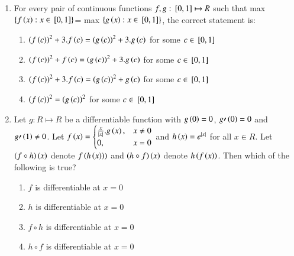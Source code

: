 \documentclass[journal,12pt,twocolumn]{IEEEtran}
\theoremstyle{remark}
\begin{document}
\begin{enumerate}
    \item 
    For every pair of continuous functions $f, g: {}\left[0, 1\right]\mapsto R$ such that max $\left\{f\left(x\right): x\in {}\left[0, 1\right]\right\}$= max $\left\{g\left(x\right): x\in {}\left[0, 1\right]\right\}$, the correct statement is:
   
    \hfill 
    {}
    
    \begin{enumerate}[label=(\alph*)]
        
        \item ${\left(f\left(c\right)\right)}^2+3.f\left(c\right)={\left(g\left(c\right)\right)}^2+3.g\left(c\right)$ for some $c\in {}\left[0,1\right]$
        \item ${\left(f\left(c\right)\right)}^2+f\left(c\right)={\left(g\left(c\right)\right)}^2+3.g\left(c\right)$ for some $c\in {}\left[0,1\right]$
        \item ${\left(f\left(c\right)\right)}^2+3.f\left(c\right)={\left(g\left(c\right)\right)}^2+g\left(c\right)$ for some $c\in {}\left[0,1\right]$
        \item ${\left(f\left(c\right)\right)}^2={\left(g\left(c\right)\right)}^2$ for some $c\in {}\left[0,1\right]$ 
    \end{enumerate}


    \item 
    Let $g: R\mapsto R$ be a differentiable function with $g\left(0\right)=0$, $g\prime\left(0\right)=0$ and $g\prime\left(1\right)\neq 0$. Let $f\left(x\right)=
        \begin{cases}
		\frac{x}{\left\vert x\right\vert}.g\left(x\right), & x\neq 0 \\
            0, & x=0
        \end{cases}$ 
        and $h\left(x\right)=e^{\left\vert x\right\vert}$ for all $x\in R$. Let $\left(f\circ h\right)\left(x\right)$ denote $f\left(h\left(x\right)\right))$ and $\left(h\circ f\right)\left(x\right)$ denote $h\left(f\left(x\right)\right)$. Then which of the following is true?
        
    \hfill 
    {}
    
    \begin{enumerate}[label=(\alph*)]
        
        \item $f$ is differentiable at $x=0$ 
        \item $h$ is differentiable at $x=0$ 
        \item $f\circ h$ is differentiable at $x=0$ 
        \item $h\circ f$ is differentiable at $x=0$  
    \end{enumerate}



\end{enumerate}
\end{document}
